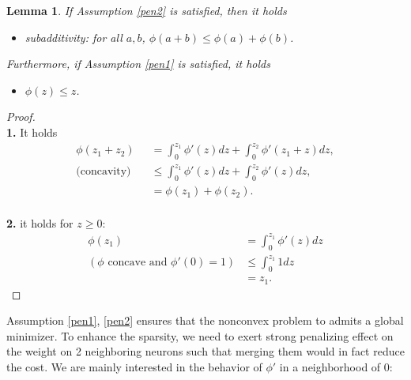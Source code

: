 \documentclass[12pt,fleqn]{amsart}
\newtheorem{lemma}[theorem]{Lemma}
\theoremstyle{definition}
\begin{document}
\begin{lemma} \label{firstorderestimate} If Assumption \ref{pen2} is satisfied, then it holds
\begin{itemize}
	\item subadditivity: for all $a, b$,  $\phi(a + b) \le \phi(a) + \phi(b)$. 
\end{itemize}
Furthermore, if Assumption \ref{pen1} is satisfied, it holds
\begin{itemize}
	\item $ \phi(z) \le z$.
\end{itemize}
\end{lemma}
\begin{proof}
	\quad\\
	\textbf{1.}  It holds
	\begin{align*}
		\phi(z_1 + z_2) &= \int_0^{z_1} \phi'(z) dz + \int_0^{z_2} \phi'(z_1 + z) dz, \\
(\text{concavity)}\quad		&\le  \int_0^{z_1} \phi'(z) dz + \int_0^{z_2} \phi'(z) dz, \\
\quad		& = \phi(z_1) + \phi(z_2).
	\end{align*}
	\quad\\
	\textbf{2.} it holds for $z \ge 0$:
	\begin{align*}
		\phi(z_1) &= \int_0^{z_1} \phi'(z) dz\\
		 (\phi \text{ concave and } \phi'(0) = 1)  & \le \int_0^{z_1} 1 dz \\
		 &= z_1.
	\end{align*}
\end{proof}
 
 
Assumption \ref{pen1}, \ref{pen2} ensures that the nonconvex problem to admits a global minimizer. 
To enhance the sparsity, we need to exert strong penalizing effect on the weight on 2 neighboring neurons such that merging them would in fact reduce the cost. 
We are mainly interested in the behavior of $\phi'$ in a neighborhood of $0$: 
 
\end{document}
